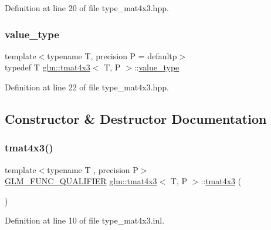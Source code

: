 Definition at line 20 of file type\+\_\+mat4x3.\+hpp.

\mbox{\label{structglm_1_1tmat4x3_ad877c31a46be38d67ef6e93881c44ecf}} 
\subsubsection{\texorpdfstring{value\_type}{value\_type}}
{\footnotesize\ttfamily template$<$typename T, precision P = defaultp$>$ \\
typedef T \mbox{\hyperlink{structglm_1_1tmat4x3}{glm\+::tmat4x3}}$<$ T, P $>$\+::\mbox{\hyperlink{structglm_1_1tmat4x3_ad877c31a46be38d67ef6e93881c44ecf}{value\+\_\+type}}}



Definition at line 22 of file type\+\_\+mat4x3.\+hpp.



\subsection{Constructor \& Destructor Documentation}
\mbox{\label{structglm_1_1tmat4x3_aca9d4b06f9ccb23df420cefd945e3374}} 
\subsubsection{\texorpdfstring{tmat4x3()}{tmat4x3()}\hspace{0.1cm}{\footnotesize\ttfamily [1/22]}}
{\footnotesize\ttfamily template$<$typename T , precision P$>$ \\
\mbox{\hyperlink{setup_8hpp_a33fdea6f91c5f834105f7415e2a64407}{G\+L\+M\+\_\+\+F\+U\+N\+C\+\_\+\+Q\+U\+A\+L\+I\+F\+I\+ER}} \mbox{\hyperlink{structglm_1_1tmat4x3}{glm\+::tmat4x3}}$<$ T, P $>$\+::\mbox{\hyperlink{structglm_1_1tmat4x3}{tmat4x3}} (\begin{DoxyParamCaption}{ }\end{DoxyParamCaption})}



Definition at line 10 of file type\+\_\+mat4x3.\+inl.

\mbox{\label{structglm_1_1tmat4x3_a5741733ec73d12a93fd1088965fb0523}} 
